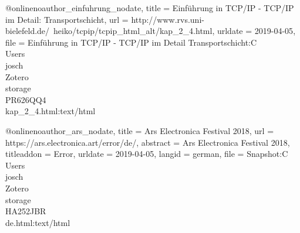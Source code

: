 
@online{noauthor_einfuhrung_nodate,
	title = {Einführung in {TCP}/{IP} - {TCP}/{IP} im Detail: Transportschicht},
	url = {http://www.rvs.uni-bielefeld.de/~heiko/tcpip/tcpip_html_alt/kap_2_4.html},
	urldate = {2019-04-05},
	file = {Einführung in TCP/IP - TCP/IP im Detail\: Transportschicht:C\:\\Users\\josch\\Zotero\\storage\\PR626QQ4\\kap_2_4.html:text/html}
}

@online{noauthor_ars_nodate,
	title = {Ars Electronica Festival 2018},
	url = {https://ars.electronica.art/error/de/},
	abstract = {Ars Electronica Festival 2018},
	titleaddon = {Error},
	urldate = {2019-04-05},
	langid = {german},
	file = {Snapshot:C\:\\Users\\josch\\Zotero\\storage\\HA252JBR\\de.html:text/html}
}